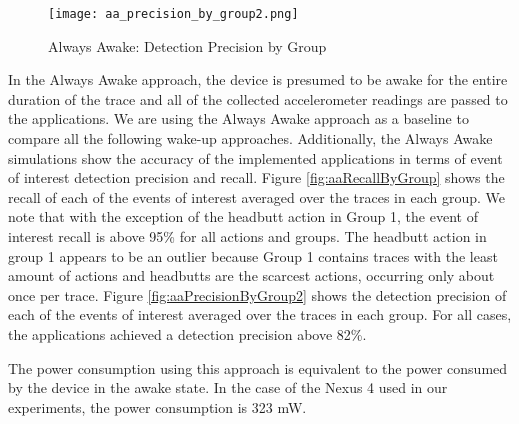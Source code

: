 \begin{figure}[t]
	\texttt{[image: aa\_precision\_by\_group2.png]}
	\caption{Always Awake: Detection Precision by Group}
    	\label{fig:aaPrecisionByGroup}
\end{figure}

In the Always Awake approach, the device is presumed to be awake for the entire duration of the trace and all of the collected accelerometer readings are passed to the applications. We are using the Always Awake approach as a baseline to compare all the following wake-up approaches. Additionally, the Always Awake simulations show the accuracy of the implemented applications in terms of event of interest detection precision and recall. Figure \ref{fig:aaRecallByGroup} shows the recall of each of the events of interest averaged over the traces in each group. We note that with the exception of the headbutt action in Group 1, the event of interest recall is above 95\% for all actions and groups. The headbutt action in group 1 appears to be an outlier because Group 1 contains traces with the least amount of actions and headbutts are the scarcest actions, occurring only about once per trace. Figure \ref{fig:aaPrecisionByGroup2} shows the detection precision of each of the events of interest averaged over the traces in each group. For all cases, the applications achieved a detection precision above 82\%.

The power consumption using this approach is equivalent to the power consumed by the device in the awake state. In the case of the Nexus 4 used in our experiments, the power consumption is 323 mW.

